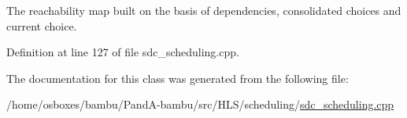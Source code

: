 The reachability map built on the basis of dependencies, consolidated choices and current choice. 



Definition at line 127 of file sdc\+\_\+scheduling.\+cpp.



The documentation for this class was generated from the following file\+:\begin{DoxyCompactItemize}
\item 
/home/osboxes/bambu/\+Pand\+A-\/bambu/src/\+H\+L\+S/scheduling/\hyperlink{sdc__scheduling_8cpp}{sdc\+\_\+scheduling.\+cpp}\end{DoxyCompactItemize}
